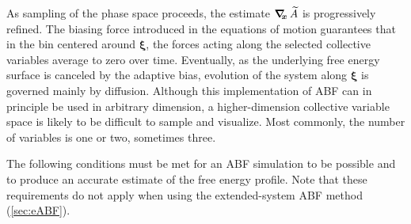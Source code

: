 As sampling of the phase space proceeds, the estimate
$\mbox{\boldmath$\nabla_{\!\!x}\,$} \widetilde A$ is progressively refined. The biasing
force introduced in the equations of motion guarantees that in
the bin centered around $\bm{\xi}$,
the forces acting along the selected collective variables average
to zero over time. Eventually, as the underlying free energy surface is canceled
by the adaptive bias, evolution of the system along $\bm{\xi}$
is governed mainly by diffusion.
Although this implementation of ABF can in principle be used in
arbitrary dimension, a higher-dimension collective variable space is likely
to be difficult to sample and visualize.
Most commonly, the number of variables is one or two, sometimes three.



The following conditions must be met for an ABF simulation to be possible and
to produce an accurate estimate of the free energy profile.
Note that these requirements do not apply when using the extended-system
ABF method (\ref{sec:eABF}).

